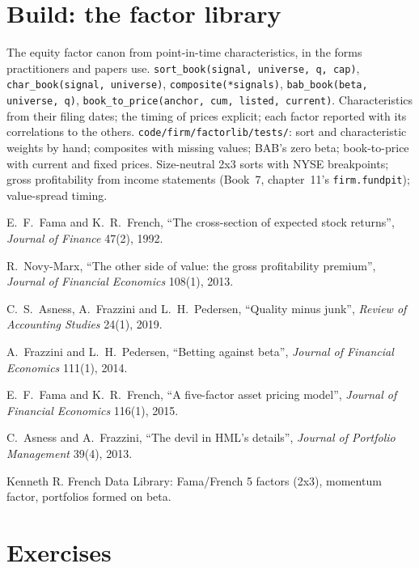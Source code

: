 \section{Build: the factor library}\label{bld:s1:value-quality-and-low-risk:factorlib}

\begin{build}
 The equity factor canon from point-in-time characteristics, in the forms practitioners and papers use.
 \texttt{sort\_book(signal, universe, q, cap)}, \texttt{char\_book(signal, universe)}, \texttt{composite(*signals)},
\texttt{bab\_book(beta, universe, q)}, \texttt{book\_to\_price(anchor, cum, listed, current)}.
 Characteristics from their filing dates; the timing of prices explicit; each factor reported with its correlations to the others.
 \texttt{code/firm/factorlib/tests/}: sort and characteristic weights by hand; composites with missing values; BAB's zero beta;
book-to-price with current and fixed prices.
 Size-neutral 2x3 sorts with NYSE breakpoints; gross profitability from income statements (Book~7, chapter~11's \texttt{firm.fundpit});
value-spread timing.
\end{build}

\begin{omsources}
\item E.~F.~Fama and K.~R.~French, ``The cross-section of expected stock returns'', \emph{Journal of Finance} 47(2), 1992.
\item R.~Novy-Marx, ``The other side of value: the gross profitability premium'', \emph{Journal of Financial Economics} 108(1), 2013.
\item C.~S.~Asness, A.~Frazzini and L.~H.~Pedersen, ``Quality minus junk'', \emph{Review of Accounting Studies} 24(1), 2019.
\item A.~Frazzini and L.~H.~Pedersen, ``Betting against beta'', \emph{Journal of Financial Economics} 111(1), 2014.
\item E.~F.~Fama and K.~R.~French, ``A five-factor asset pricing model'', \emph{Journal of Financial Economics} 116(1), 2015.
\item C.~Asness and A.~Frazzini, ``The devil in HML's details'', \emph{Journal of Portfolio Management} 39(4), 2013.
\item Kenneth R. French Data Library: Fama/French 5 factors (2x3), momentum factor, portfolios formed on beta.
\end{omsources}

\section{Exercises}

